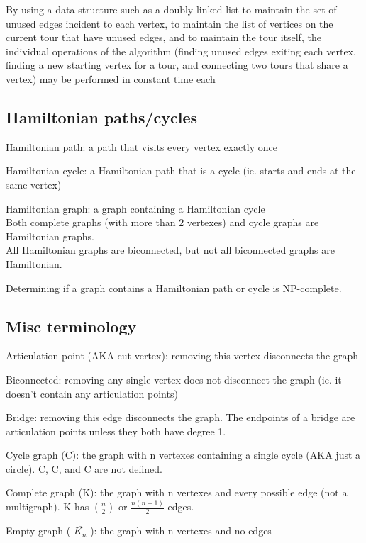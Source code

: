 By using a data structure such as a doubly linked list to maintain the set of unused edges incident to each vertex, to maintain the list of vertices on the current tour that have unused edges, and to maintain the tour itself, the individual operations of the algorithm (finding unused edges exiting each vertex, finding a new starting vertex for a tour, and connecting two tours that share a vertex) may be performed in constant time each

\subsection*{Hamiltonian paths/cycles} 

Hamiltonian path: a path that visits every vertex exactly once

Hamiltonian cycle: a Hamiltonian path that is a cycle (ie. starts and ends at the same vertex)

Hamiltonian graph: a graph containing a Hamiltonian cycle \\
\indent Both complete graphs (with more than 2 vertexes) and cycle graphs are Hamiltonian graphs. \\
\indent All Hamiltonian graphs are biconnected, but not all biconnected graphs are Hamiltonian.

Determining if a graph contains a Hamiltonian path or cycle is NP-complete.

\subsection*{Misc terminology}

Articulation point (AKA cut vertex): removing this vertex disconnects the graph

Biconnected: removing any single vertex does not disconnect the graph (ie. it doesn't contain any articulation points)

Bridge: removing this edge disconnects the graph. The endpoints of a bridge are articulation points unless they both have degree 1.

Cycle graph (C): the graph with n vertexes containing a single cycle (AKA just a circle). C, C, and C are not defined.

Complete graph (K): the graph with n vertexes and every possible edge (not a multigraph). K has $\binom{n}{2}$ or $\frac{n(n-1)}{2}$ edges.

Empty graph ( $\overline{K_n}$ ): the graph with n vertexes and no edges

